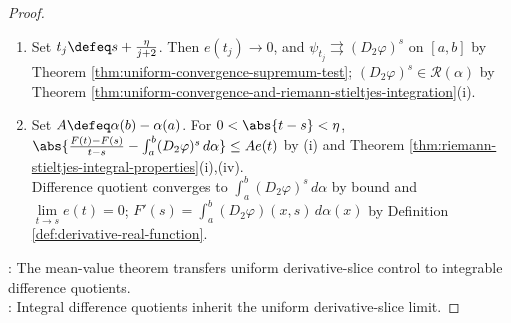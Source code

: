 \begin{theorem}
\begin{proof}
\begin{enumerate}[label=(\roman*)]
\setlength{\itemsep}{0pt}
\item Set $t_j\defeq s+\frac{\eta}{j+2}$. Then $e(t_j)\to0$, and $\psi_{t_j}\rightrightarrows(D_2\varphi)^s$ on $[a,b]$ by Theorem \ref{thm:uniform-convergence-supremum-test}; $(D_2\varphi)^s\in\mathcal{R}(\alpha)$ by Theorem \ref{thm:uniform-convergence-and-riemann-stieltjes-integration}(i).
\item Set $A\defeq\alpha(b)-\alpha(a)$. For $0<\abs{t-s}<\eta$, $\abs{\frac{F(t)-F(s)}{t-s}-\int_a^b(D_2\varphi)^s\,d\alpha}\leq Ae(t)$ by (i) and Theorem \ref{thm:riemann-stieltjes-integral-properties}(i),(iv).\\
Difference quotient converges to $\int_a^b(D_2\varphi)^s\,d\alpha$ by bound and $\lim\limits_{t\to s}e(t)=0$; $F'(s)=\int_a^b(D_2\varphi)(x,s)\,d\alpha(x)$ by Definition \ref{def:derivative-real-function}.
\end{enumerate}
: The mean-value theorem transfers uniform derivative-slice control to integrable difference quotients.\\
: Integral difference quotients inherit the uniform derivative-slice limit.
\end{proof}
\end{theorem}

